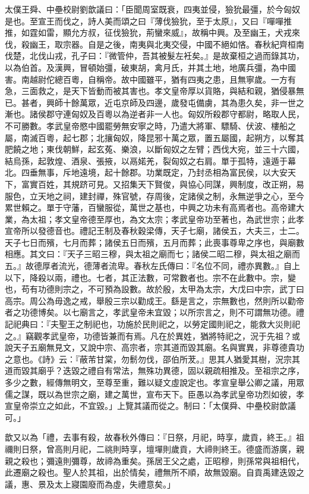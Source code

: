 \begin{pinyinscope}
太僕王舜、中壘校尉劉歆議曰：「臣聞周室既衰，四夷並侵，獫狁最彊，於今匈奴是也。至宣王而伐之，詩人美而頌之曰『薄伐獫狁，至于太原』，又曰『嘽嘽推推，如霆如雷，顯允方叔，征伐獫狁，荊蠻來威』，故稱中興。及至幽王，犬戎來伐，殺幽王，取宗器。自是之後，南夷與北夷交侵，中國不絕如悋。春秋紀齊桓南伐楚，北伐山戎，孔子曰：『微管仲，吾其被髮左衽矣。』是故棄桓之過而錄其功，以為伯首。及漢興，冒頓始彊，破東胡，禽月氏，并其土地，地廣兵彊，為中國害。南越尉佗總百粵，自稱帝。故中國雖平，猶有四夷之患，且無寧歲。一方有急，三面救之，是天下皆動而被其害也。孝文皇帝厚以貨賂，與結和親，猶侵暴無已。甚者，興師十餘萬眾，近屯京師及四邊，歲發屯備虜，其為患久矣，非一世之漸也。諸侯郡守連匈奴及百粵以為逆者非一人也。匈奴所殺郡守都尉，略取人民，不可勝數。孝武皇帝愍中國罷勞無安寧之時，乃遣大將軍、驃騎、伏波、樓船之屬，南滅百粵，起七郡；北攘匈奴，降昆邪十萬之眾，置五屬國，起朔方，以奪其肥饒之地；東伐朝鮮，起玄菟、樂浪，以斷匈奴之左臂；西伐大宛，並三十六國，結烏孫，起敦煌、酒泉、張掖，以鬲婼羌，裂匈奴之右肩。單于孤特，遠遁于幕北。四垂無事，斥地遠境，起十餘郡。功業既定，乃封丞相為富民侯，以大安天下，富實百姓，其規跻可見。又招集天下賢俊，與協心同謀，興制度，改正朔，易服色，立天地之祠，建封禪，殊官號，存周後，定諸侯之制，永無逆爭之心，至今累世賴之。單于守藩，百蠻服從，萬世之基也，中興之功未有高焉者也。高帝建大業，為太祖；孝文皇帝德至厚也，為文太宗；孝武皇帝功至著也，為武世宗；此孝宣帝所以發德音也。禮記王制及春秋穀梁傳，天子七廟，諸侯五，大夫三，士二。天子七日而殯，七月而葬；諸侯五日而殯，五月而葬；此喪事尊卑之序也，與廟數相應。其文曰：『天子三昭三穆，與太祖之廟而七；諸侯二昭二穆，與太祖之廟而五。』故德厚者流光，德薄者流卑。春秋左氏傳曰：『名位不同，禮亦異數。』自上以下，降殺以兩，禮也。七者，其正法數，可常數者也。宗不在此數中。宗，變也，苟有功德則宗之，不可預為設數。故於殷，太甲為太宗，大戊曰中宗，武丁曰高宗。周公為毋逸之戒，舉殷三宗以勸成王。繇是言之，宗無數也，然則所以勸帝者之功德博矣。以七廟言之，孝武皇帝未宜毀；以所宗言之，則不可謂無功德。禮記祀典曰：『夫聖王之制祀也，功施於民則祀之，以勞定國則祀之，能救大災則祀之。』竊觀孝武皇帝，功德皆兼而有焉。凡在於異姓，猶將特祀之，況于先祖？或說天子五廟無見文，又說中宗、高宗者，宗其道而毀其廟。名與實異，非尊德貴功之意也。《詩》云：『蔽芾甘棠，勿鬋勿伐，邵伯所茇。』思其人猶愛其樹，況宗其道而毀其廟乎？迭毀之禮自有常法，無殊功異德，固以親疏相推及。至祖宗之序，多少之數，經傳無明文，至尊至重，難以疑文虛說定也。孝宣皇舉公卿之議，用眾儒之謀，既以為世宗之廟，建之萬世，宣布天下。臣愚以為孝武皇帝功烈如彼，孝宣皇帝崇立之如此，不宜毀。」上覽其議而從之。制曰：「太僕舜、中壘校尉歆議可。」

歆又以為「禮，去事有殺，故春秋外傳曰：『日祭，月祀，時享，歲貢，終王。』祖禰則日祭，曾高則月祀，二祧則時享，壇墠則歲貢，大禘則終王。德盛而游廣，親親之殺也；彌遠則彌尊，故禘為重矣。孫居王父之處，正昭穆，則孫常與祖相代，此遷廟之殺也。聖人於其祖，出於情矣，禮無所不順，故無毀廟。自貢禹建迭毀之議，惠、景及太上寢園廢而為虛，失禮意矣。」


\end{pinyinscope}
